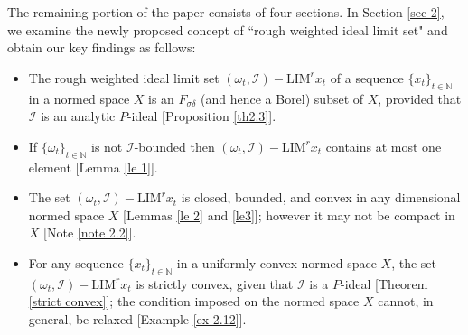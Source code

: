 \documentclass[reqno]{amsart}
\begin{document}
The remaining portion of the paper consists of four sections. In Section \ref{sec 2}, we examine the newly proposed concept of ``rough weighted ideal limit set" and obtain our key findings as follows:
\begin{itemize}
\item
The rough weighted ideal limit set $(\omega_t,\mathcal{I})-\text{LIM}^r x_t$ of a sequence $\{x_t\}_{t\in\mathbb{N}}$ in a normed space $X$ is an $F_{\sigma\delta}$ (and hence a Borel) subset of $X$, provided that $\mathcal{I}$ is an analytic $P$-ideal [Proposition \ref{th2.3}].
\item If $\{\omega_t\}_{t\in\mathbb{N}}$ is not $\mathcal{I}$-bounded then  $(\omega_t,\mathcal{I})-\text{LIM}^r x_t$  contains at most one element [Lemma \ref{le 1}].
\item  The set $(\omega_t,\mathcal{I})-\text{LIM}^r x_t$ is closed, bounded, and convex in any dimensional normed space $X$ [Lemmas \ref{le 2} and \ref{le3}]; however it may not be compact in $X$ [Note \ref{note 2.2}].
\item For any sequence $\{x_t\}_{t\in\mathbb{N}}$ in a uniformly convex normed space \(X\), the set $(\omega_t, \mathcal{I})-\text{LIM}^r x_t$ is strictly convex, given that $\mathcal{I}$ is a $P$-ideal [Theorem \ref{strict convex}]; the condition imposed on the normed space $X$ cannot, in general, be relaxed [Example \ref {ex 2.12}].
\end{itemize}
\end{document}
